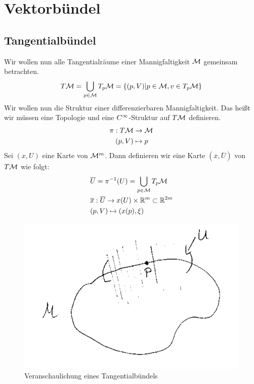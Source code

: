 \chapter{Vektorbündel}
\section{Tangentialbündel}
Wir wollen nun alle Tangentialräume einer Mannigfaltigkeit $\mathcal{M}$ gemeinsam betrachten.
\begin{align}
T\mathcal{M} = \bigcup_{p\in \mathcal{M}} T_{p}\mathcal{M} = \{ (p, V) \vert p \in \mathcal{M}, v \in T_{p}\mathcal{M} \} 
\end{align}
Wir wollen nun die Struktur einer differenzierbaren Mannigfaltigkeit. 
Das heißt wir müssen eine Topologie und eine $C^\infty$-Struktur auf $T\mathcal{M}$ definieren.
\begin{align}
\pi: T\mathcal{M} &\to \mathcal{M} \\
(p,V) &\mapsto p
\end{align}
Sei $(x, U)$ eine Karte von $\mathcal{M}^m$. 
Dann definieren wir eine Karte $(\overline{x}, \overline{U})$ von $T\mathcal{M}$ wie folgt:
\begin{align}
&\overline{U} = \pi^{-1}(U) = \bigcup_{p\in\mathcal{M}} T_{p}\mathcal{M} \\
&\overline{x}: \overline{U} \to x(U) \times \mathbb{R}^m \subset \mathbb{R}^{2m} \\
&(p, V) \mapsto (x(p), \xi)
\end{align}

\begin{figure}[h]
\centering
\includegraphics[width=0.4\linewidth]{figures/scan/tangentialbuendel.png}
\caption{Veranschaulichung eines Tangentialbündels}
\label{img:tangentialbuendel}
\end{figure} 

